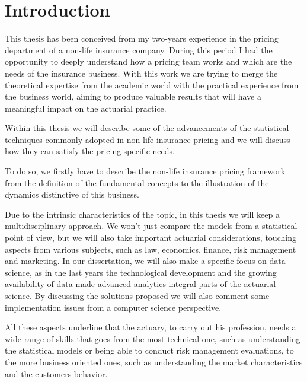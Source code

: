 \documentclass[a4paper, twoside, openright, 12pt]{report}
\theoremstyle{definition}
\theoremstyle{definition}
\theoremstyle{definition}
\theoremstyle{remark}
\begin{document}

\hypertarget{introduction}{%
\chapter*{Introduction}\label{introduction}}


This thesis has been conceived from my two-years experience in the pricing department of a non-life insurance company. During this period I had the opportunity to deeply understand how a pricing team works and which are the needs of the insurance business. With this work we are trying to merge the theoretical expertise from the academic world with the practical experience from the business world, aiming to produce valuable results that will have a meaningful impact on the actuarial practice.

Within this thesis we will describe some of the advancements of the statistical techniques commonly adopted in non-life insurance pricing and we will discuss how they can satisfy the pricing specific needs.

To do so, we firstly have to describe the non-life insurance pricing framework from the definition of the fundamental concepts to the illustration of the dynamics distinctive of this business.

Due to the intrinsic characteristics of the topic, in this thesis we will keep a multidisciplinary approach. We won't just compare the models from a statistical point of view, but we will also take important actuarial considerations, touching aspects from various subjects, such as law, economics, finance, risk management and marketing.
In our dissertation, we will also make a specific focus on data science, as in the last years the technological development and the growing availability of data made advanced analytics integral parts of the actuarial science.
By discussing the solutions proposed we will also comment some implementation issues from a computer science perspective.

All these aspects underline that the actuary, to carry out his profession, needs a wide range of skills that goes from the most technical one, such as understanding the statistical models or being able to conduct risk management evaluations, to the more business oriented ones, such as understanding the market characteristics and the customers behavior.
\end{document}
